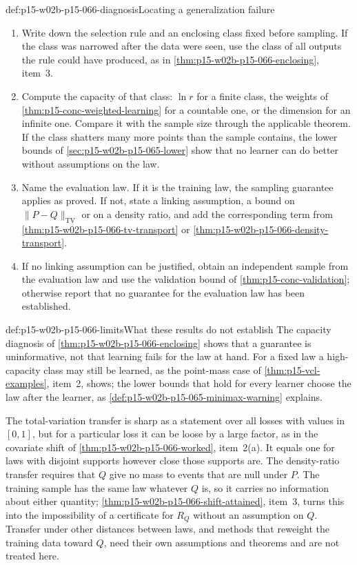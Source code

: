 \begin{hbmethod}{def:p15-w02b-p15-066-diagnosis}{Locating a generalization failure}
\begin{enumerate}
\item Write down the selection rule and an enclosing class fixed before
      sampling. If the class was narrowed after the data were seen, use
      the class of all outputs the rule could have produced, as in
      \cref{thm:p15-w02b-p15-066-enclosing}, item~3.
\item Compute the capacity of that class: \(\ln r\) for a finite class,
      the weights of \cref{thm:p15-conc-weighted-learning} for a
      countable one, or the dimension for an infinite one. Compare it
      with the sample size through the applicable theorem. If the
      class shatters many more points than the sample contains, the
      lower bounds of \cref{sec:p15-w02b-p15-065-lower} show that no
      learner can do better without assumptions on the law.
\item Name the evaluation law. If it is the training law, the
      sampling guarantee applies as proved. If not, state a linking
      assumption, a bound on \(\|P-Q\|_{\mathrm{TV}}\) or on a density
      ratio, and add the corresponding term from
      \cref{thm:p15-w02b-p15-066-tv-transport} or
      \cref{thm:p15-w02b-p15-066-density-transport}.
\item If no linking assumption can be justified, obtain an independent
      sample from the evaluation law and use the validation bound of
      \cref{thm:p15-conc-validation}; otherwise report that no
      guarantee for the evaluation law has been established.
\end{enumerate}
\end{hbmethod}

\begin{hbwarning}{def:p15-w02b-p15-066-limits}{What these results do not establish}
The capacity diagnosis of \cref{thm:p15-w02b-p15-066-enclosing} shows
that a guarantee is uninformative, not that learning fails for the law at
hand. For a fixed law a high-capacity class may still be learned, as the
point-mass case of \cref{thm:p15-vcl-examples}, item~2, shows; the lower
bounds that hold for every learner choose the law after the learner, as
\cref{def:p15-w02b-p15-065-minimax-warning} explains.

The total-variation transfer is sharp as a statement over all losses with
values in \([0,1]\), but for a particular loss it can be loose by a large
factor, as in the covariate shift of
\cref{thm:p15-w02b-p15-066-worked}, item~2(a). It equals one for laws
with disjoint supports however close those supports are. The density-ratio
transfer requires that \(Q\) give no mass to events that are null under
\(P\). The training sample has the same law whatever \(Q\) is, so it
carries no information about either quantity;
\cref{thm:p15-w02b-p15-066-shift-attained}, item~3, turns this into the
impossibility of a certificate for \(R_Q\) without an assumption on
\(Q\).
Transfer under other distances between laws, and methods that reweight
the training data toward \(Q\), need their own assumptions and theorems
and are not treated here.
\end{hbwarning}
